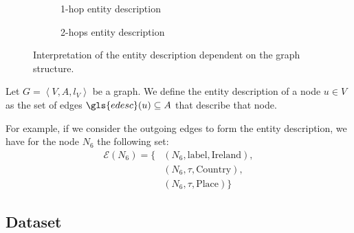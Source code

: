 \begin{figure}
	\centering
	\begin{subfigure}[b]{.45\textwidth}
		\resizebox{.6\textwidth}{!}{
			
		}
		\caption{1-hop entity description}
		\label{fig:edesc1}
	\end{subfigure}
	\quad
	\begin{subfigure}[b]{.45\textwidth}
		\resizebox{\textwidth}{!}{
			
		}
		\caption{2-hops entity description}
		\label{fig:edesc2}
	\end{subfigure}
	\caption{Interpretation of the entity description dependent on the graph structure.}
	\label{fig:edesc}
\end{figure}

%

\begin{definition}
Let $G = \left\langle V, A, l_V \right\rangle$ be a graph. We define the entity description of a node $u \in V$ as the set of edges $\gls{edesc}(u) \subseteq A$ that describe that node.
\label{def:entity-description}
\end{definition}

For example, if we consider the outgoing edges to form the entity description, we have for the node $N_6$ the following set:
$$
\begin{aligned}
\mathcal{E}\left( N_6 \right) = \{ & \left( N_6, \text{label}, \text{Ireland} \right),\\
& \left( N_6, \tau, \text{Country} \right),\\
& \left( N_6, \tau, \text{Place} \right) \}
\end{aligned}
$$

\subsection{Dataset}


